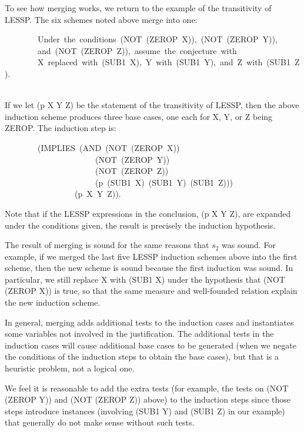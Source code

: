 \documentclass[11pt]{book}
\newenvironment{pubasis}{\begin{flushleft}\ttfamily\small}{\normalsize\rmfamily\end{flushleft}}
\begin{document}
To see how merging works, we  return to the example of
the transitivity of LESSP.  The six schemes noted above merge into one:
\begin{pubasis}
~~~~~~~~Under~the~conditions~(NOT~(ZEROP~X)),~(NOT~(ZEROP~Y)),\\
~~~~~~~~and~(NOT~(ZEROP~Z)),~assume~the~conjecture~with\\
~~~~~~~~X~replaced~with~(SUB1~X),~Y~with~(SUB1~Y),~and~Z~with~(SUB1~Z).\\
~\\
\end{pubasis}
If we let (p X Y Z) be the statement of the transitivity of LESSP, then
the above induction scheme  produces three base cases, one each for
X, Y, or Z being ZEROP.  The induction step is:
\begin{pubasis}
~~~~~~~~(IMPLIES~(AND~(NOT~(ZEROP~X))\\
~~~~~~~~~~~~~~~~~~~~~~(NOT~(ZEROP~Y))\\
~~~~~~~~~~~~~~~~~~~~~~(NOT~(ZEROP~Z))\\
~~~~~~~~~~~~~~~~~~~~~~(p~(SUB1~X)~(SUB1~Y)~(SUB1~Z)))\\
~~~~~~~~~~~~~~~~~(p~X~Y~Z)).\\
\end{pubasis}
Note that if the LESSP expressions in the conclusion, (p X Y Z), are
expanded under the conditions given, the result is precisely the induction
hypothesis.

The result of merging is sound for the same reasons that $s_{2}$ was sound.
For example, if we merged the last five LESSP induction schemes above
into the first scheme,
then the new scheme is sound because the first induction was
sound.  In particular, we still replace X with (SUB1 X) under the hypothesis
that (NOT (ZEROP X)) is true, so that the same measure and well-founded
relation explain the new induction scheme.

In general, merging
adds additional tests to the induction cases
and instantiates some variables not involved in the justification.
The additional tests in the induction cases
will cause additional base cases to be generated (when we negate the
conditions of the induction steps to obtain the base cases), but
that is a heuristic problem, not a logical one.

We feel it is reasonable to add the extra tests (for example, the
tests on (NOT (ZEROP Y)) and (NOT (ZEROP Z)) above) to the induction steps
since those steps introduce instances (involving (SUB1 Y) and (SUB1 Z) in
our example) that generally do not make sense without such tests.
\end{document}
